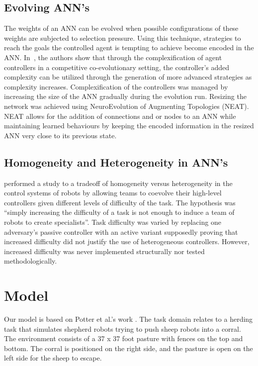 \documentclass[conference]{IEEEtran}
\begin{document}
\subsection{Evolving ANN's}
The weights of an ANN can be evolved when possible configurations of these weights are subjected to selection pressure.
Using this technique, strategies to reach the goals the controlled agent is tempting to achieve become encoded in the ANN.
In~\cite{stanley2004competitive}, the authors show that through the complexification of agent controllers in a competitive co-evolutionary setting, the controller's added complexity can be utilized through the generation of more advanced strategies as complexity increases. 
Complexification of the controllers was managed by increasing the size of the ANN gradually during the evolution run.
Resizing the network was achieved using NeuroEvolution of Augmenting Topologies (NEAT).
NEAT allows for the addition of connections and or nodes to an ANN while maintaining learned behaviours by keeping the encoded information in the resized ANN very close to its previous state.

\subsection{Homogeneity and Heterogeneity in ANN's}
\cite{potter2001heterogeneity} performed a study to a tradeoff of homogeneity versus heterogeneity in the control systems of robots by allowing teams to coevolve their high-level controllers given different levels of difficulty of the task.
The hypothesis was ``simply increasing the difficulty of a task is not enough to induce a team of robots to create specialists''.
Task difficulty was varied by replacing one adversary's passive controller with an active variant supposedly proving that increased difficulty did not justify the use of heterogeneous controllers.
However, increased difficulty was never implemented structurally nor tested methodologically. 

\section{Model}
Our model is based on Potter et al.'s work \cite{potter2001heterogeneity}. 
The task domain relates to a herding task that simulates shepherd robots trying to push sheep robots into a corral. The environment consists of a 37 x 37 foot pasture with fences on the top and bottom. The corral is positioned on the right side, and the pasture is open on the left side for the sheep to escape.
\end{document}
